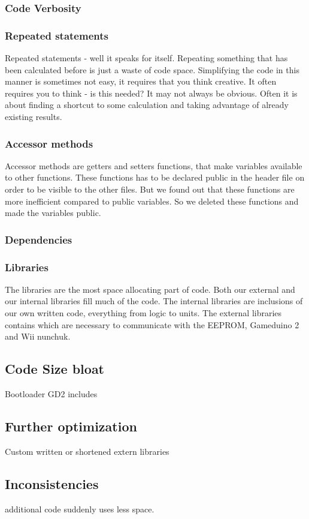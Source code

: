 \subsubsection{Code Verbosity}

\subsubsection{Repeated statements }
Repeated statements - well it speaks for itself. Repeating something that has been calculated
before is just a waste of code space. Simplifying the code in this manner is sometimes
not easy, it requires that you think creative. It often requires you to think - is this
needed? It may not always be obvious. Often it is about finding a shortcut to some
calculation and taking advantage of already existing results.

\subsubsection{Accessor methods}
Accessor methods are getters and setters functions, that make
variables available to other functions. These functions has to
be declared public in the header file on order to be visible to the
other files. But we found out that these functions are more inefficient
compared to public variables. So we deleted these functions
and made the variables public.

\subsubsection{Dependencies}

\subsubsection{Libraries}
The libraries are the most space allocating part of code. Both our external and
our internal libraries fill much of the code. The internal libraries are
inclusions of our own written code, everything from logic to units. The external
libraries contains which are necessary to communicate with the EEPROM,
Gameduino 2 and Wii nunchuk.

\subsection{Code Size bloat} Bootloader GD2 includes \subsection{Further
optimization} Custom written or shortened extern libraries

\subsection{Inconsistencies} %
additional code suddenly uses less space.